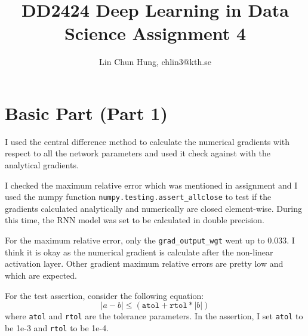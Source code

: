 \documentclass[12pt]{article}
\newenvironment{question}[2][Question]{\begin{trivlist}
\kern10pt
\item[\hskip \labelsep {\bfseries #1}\hskip \labelsep {\bfseries #2.}]}{\end{trivlist}}
\begin{document}
\title{DD2424 Deep Learning in Data Science Assignment 4}
\author{Lin Chun Hung, chlin3@kth.se}

\maketitle

\section{Basic Part (Part 1)}

\begin{question}{i}
I used the central difference method to calculate the numerical gradients
with respect to all the network parameters and used it check against with the
analytical gradients.

I checked the maximum relative error which was mentioned in assignment and I 
used the numpy function \texttt{numpy.testing.assert\_allclose} to test if 
the gradients calculated analytically and numerically are closed element-wise.
During this time, the RNN model was set to be calculated in double precision. 

For the maximum relative error, only the \texttt{grad\_output\_wgt} went up to 
0.033. I think it is okay as the numerical gradient is calculate after the non-linear
activation layer. Other gradient maximum relative errors are pretty low and 
which are expected.

For the test assertion, consider the following equation:
\begin{equation*}
    |a - b| \leq (\texttt{atol} + \texttt{rtol} * |b|)
\end{equation*}
where \texttt{atol} and \texttt{rtol} are the tolerance parameters.
In the assertion, I set \texttt{atol} to be 1e-3 and \texttt{rtol} to be 1e-4.
\end{question}
\end{document}
